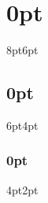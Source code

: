 \usepackage{titlesec}
\usepackage{parskip}

\titlespacing\section{0pt}{8pt}{6pt}
\titlespacing\subsection{0pt}{6pt}{4pt}
\titlespacing\subsubsection{0pt}{4pt}{2pt}

\usepackage[boxruled]{algorithm2e}
